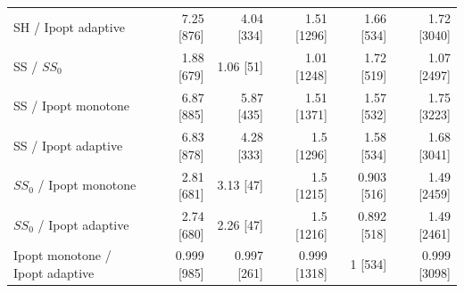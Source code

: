 \begin{tabular}{@{}lrrrrr@{}}
SH / Ipopt adaptive & 7.25 [876] & 4.04 [334] & 1.51 [1296] & 1.66 [534] & 1.72 [3040]\\
SS / $SS_0$ & 1.88 [679] & 1.06 [51] & 1.01 [1248] & 1.72 [519] & 1.07 [2497]\\
SS / Ipopt monotone & 6.87 [885] & 5.87 [435] & 1.51 [1371] & 1.57 [532] & 1.75 [3223]\\
SS / Ipopt adaptive & 6.83 [878] & 4.28 [333] & 1.5 [1296] & 1.58 [534] & 1.68 [3041]\\
$SS_0$ / Ipopt monotone & 2.81 [681] & 3.13 [47] & 1.5 [1215] & 0.903 [516] & 1.49 [2459]\\
$SS_0$ / Ipopt adaptive & 2.74 [680] & 2.26 [47] & 1.5 [1216] & 0.892 [518] & 1.49 [2461]\\
Ipopt monotone / Ipopt adaptive & 0.999 [985] & 0.997 [261] & 0.999 [1318] & 1 [534] & 0.999 [3098]\\
\bottomrule
\end{tabular}
